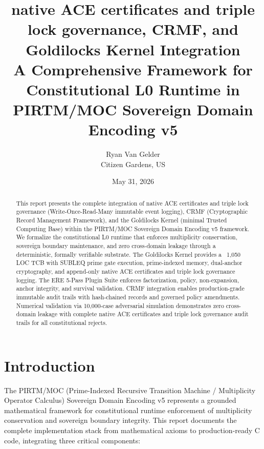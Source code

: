 \documentclass[11pt,a4paper]{article}
\begin{document}
\title{\textbf{native ACE certificates and triple lock governance, CRMF, and Goldilocks Kernel Integration}\\[0.5em]
\large A Comprehensive Framework for Constitutional L0 Runtime in PIRTM/MOC Sovereign Domain Encoding v5}
\author{Ryan Van Gelder\\Citizen Gardens, US}
\date{May 31, 2026}

\maketitle

\begin{abstract}
This report presents the complete integration of native ACE certificates and triple lock governance (Write-Once-Read-Many immutable event logging), CRMF (Cryptographic Record Management Framework), and the Goldilocks Kernel (minimal Trusted Computing Base) within the PIRTM/MOC Sovereign Domain Encoding v5 framework. We formalize the constitutional L0 runtime that enforces multiplicity conservation, sovereign boundary maintenance, and zero cross-domain leakage through a deterministic, formally verifiable substrate. The Goldilocks Kernel provides a ~1,050 LOC TCB with SUBLEQ prime gate execution, prime-indexed memory, dual-anchor cryptography, and append-only native ACE certificates and triple lock governance logging. The ERE 5-Pass Plugin Suite enforces factorization, policy, non-expansion, anchor integrity, and survival validation. CRMF integration enables production-grade immutable audit trails with hash-chained records and governed policy amendments. Numerical validation via 10,000-case adversarial simulation demonstrates zero cross-domain leakage with complete native ACE certificates and triple lock governance audit trails for all constitutional rejects.
\end{abstract}
\newpage
\tableofcontents
\newpage

\section{Introduction}

The PIRTM/MOC (Prime-Indexed Recursive Transition Machine / Multiplicity Operator Calculus) Sovereign Domain Encoding v5 represents a grounded mathematical framework for constitutional runtime enforcement of multiplicity conservation and sovereign boundary integrity. This report documents the complete implementation stack from mathematical axioms to production-ready C code, integrating three critical components:
\end{document}
